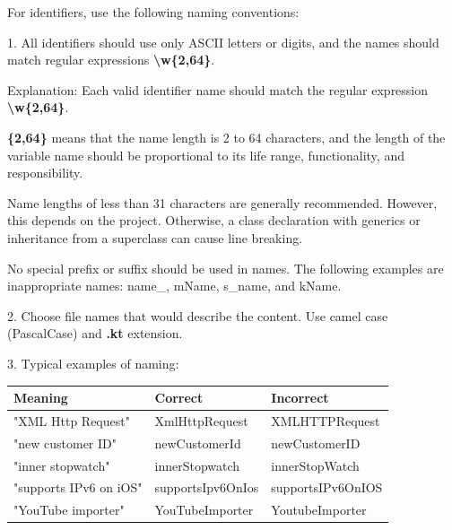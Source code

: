 \label{sec:1.1.1}



For identifiers, use the following naming conventions:

1.	All identifiers should use only ASCII letters or digits, and the names should match regular expressions \textbf{\textbackslash w\{2,64\}}.

Explanation: Each valid identifier name should match the regular expression \textbf{\textbackslash w\{2,64\}}.

\textbf{\{2,64\}} means that the name length is 2 to 64 characters, and the length of the variable name should be proportional to its life range, functionality, and responsibility.

Name lengths of less than 31 characters are generally recommended. However, this depends on the project. Otherwise, a class declaration with generics or inheritance from a superclass can cause line breaking.

No special prefix or suffix should be used in names. The following examples are inappropriate names: name\_, mName, s\_name, and kName.



2.	Choose file names that would describe the content. Use camel case (PascalCase) and \textbf{.kt} extension.



3.	Typical examples of naming:



\begin{center}

\begin{tabular}{ |p{5.0cm}|p{5.0cm}|p{5.0cm}| }

\hline

Meaning&Correct&Incorrect\\

\hline

 "XML Http Request" & XmlHttpRequest & XMLHTTPRequest \\

 "new customer ID" & newCustomerId & newCustomerID \\

 "inner stopwatch" & innerStopwatch & innerStopWatch \\

 "supports IPv6 on iOS" & supportsIpv6OnIos & supportsIPv6OnIOS \\

 "YouTube importer" & YouTubeImporter & YoutubeImporter \\

\hline

\end{tabular}

\end{center}

